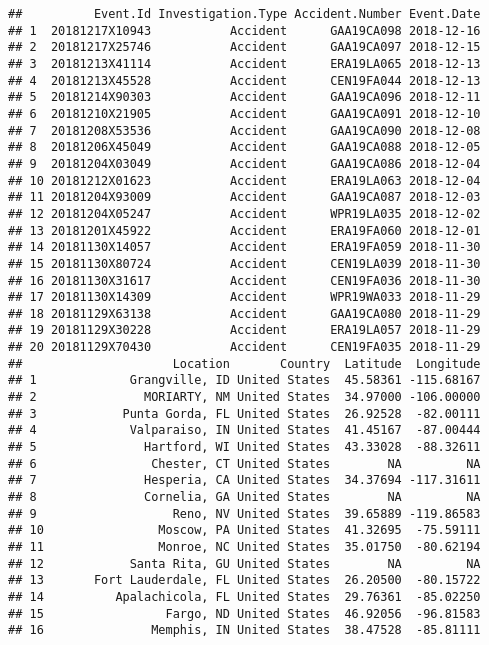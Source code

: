 \documentclass[]{article}
\begin{document}
\begin{verbatim}
##          Event.Id Investigation.Type Accident.Number Event.Date
## 1  20181217X10943           Accident      GAA19CA098 2018-12-16
## 2  20181217X25746           Accident      GAA19CA097 2018-12-15
## 3  20181213X41114           Accident      ERA19LA065 2018-12-13
## 4  20181213X45528           Accident      CEN19FA044 2018-12-13
## 5  20181214X90303           Accident      GAA19CA096 2018-12-11
## 6  20181210X21905           Accident      GAA19CA091 2018-12-10
## 7  20181208X53536           Accident      GAA19CA090 2018-12-08
## 8  20181206X45049           Accident      GAA19CA088 2018-12-05
## 9  20181204X03049           Accident      GAA19CA086 2018-12-04
## 10 20181212X01623           Accident      ERA19LA063 2018-12-04
## 11 20181204X93009           Accident      GAA19CA087 2018-12-03
## 12 20181204X05247           Accident      WPR19LA035 2018-12-02
## 13 20181201X45922           Accident      ERA19FA060 2018-12-01
## 14 20181130X14057           Accident      ERA19FA059 2018-11-30
## 15 20181130X80724           Accident      CEN19LA039 2018-11-30
## 16 20181130X31617           Accident      CEN19FA036 2018-11-30
## 17 20181130X14309           Accident      WPR19WA033 2018-11-29
## 18 20181129X63138           Accident      GAA19CA080 2018-11-29
## 19 20181129X30228           Accident      ERA19LA057 2018-11-29
## 20 20181129X70430           Accident      CEN19FA035 2018-11-29
##                     Location       Country  Latitude  Longitude
## 1             Grangville, ID United States  45.58361 -115.68167
## 2               MORIARTY, NM United States  34.97000 -106.00000
## 3            Punta Gorda, FL United States  26.92528  -82.00111
## 4             Valparaiso, IN United States  41.45167  -87.00444
## 5               Hartford, WI United States  43.33028  -88.32611
## 6                Chester, CT United States        NA         NA
## 7               Hesperia, CA United States  34.37694 -117.31611
## 8               Cornelia, GA United States        NA         NA
## 9                   Reno, NV United States  39.65889 -119.86583
## 10                Moscow, PA United States  41.32695  -75.59111
## 11                Monroe, NC United States  35.01750  -80.62194
## 12            Santa Rita, GU United States        NA         NA
## 13       Fort Lauderdale, FL United States  26.20500  -80.15722
## 14          Apalachicola, FL United States  29.76361  -85.02250
## 15                 Fargo, ND United States  46.92056  -96.81583
## 16               Memphis, IN United States  38.47528  -85.81111

\end{verbatim}
\end{document}
